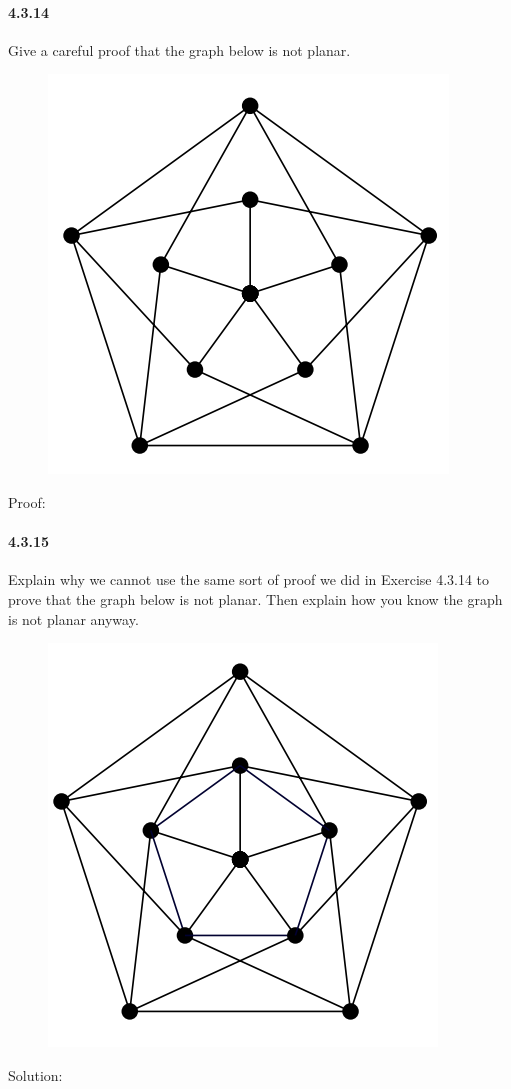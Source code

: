 \documentclass{article}
\begin{document}
\paragraph{4.3.14}
Give a careful proof that the graph below is not planar.\\
\begin{figure}[H]
    \centering
    \includegraphics{0119}
\end{figure}
Proof:\\
\paragraph{4.3.15}
Explain why we cannot use the same sort of proof we did in Exercise 4.3.14 to prove that the graph below is not planar. Then explain how you know the graph is not planar anyway.
\begin{figure}[H]
    \centering
    \includegraphics{0120}
\end{figure}
Solution:\\
\end{document}
